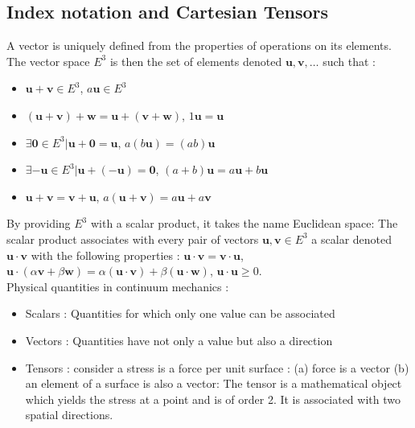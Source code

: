 \documentclass[../main.tex]{subfiles}
\begin{document}
\localtableofcontents

\subsection{Index notation and Cartesian Tensors}
A vector is uniquely defined from the properties of operations on its elements. The vector space $E^3$ is then the set of elements denoted $\mathbf{u}, \mathbf{v}, \dots$ such that : \begin{itemize}
    \item $\mathbf{u}+\mathbf{v} \in E^3$, $a\mathbf{u}\in E^3$\\
    \item $(\mathbf{u}+\mathbf{v}) + \mathbf{w} = \mathbf{u} + (\mathbf{v} + \mathbf{w})$, $1\mathbf{u} = \mathbf{u}$\\
    \item $\exists \mathbf{0} \in E^3 \lvert \mathbf{u}+ \mathbf{0} = \mathbf{u}$, $a(b\mathbf{u}) = (ab)\mathbf{u}$\\
    \item $\exists -\mathbf{u}\in E^3 \lvert \mathbf{u} + (-\mathbf{u})=\mathbf{0}$, $(a+b)\mathbf{u} = a\mathbf{u} + b\mathbf{u}$\\
    \item $\mathbf{u}+ \mathbf{v} = \mathbf{v} + \mathbf{u}$, $a(\mathbf{u}+\mathbf{v}) = a\mathbf{u} + a\mathbf{v}$\\
\end{itemize}
By providing $E^3$ with a scalar product, it takes the name Euclidean space: The scalar product associates with every pair of vectors $\mathbf{u}, \mathbf{v} \in E^3$ a scalar denoted $\mathbf{u}\cdot \mathbf{v}$ with the following properties : $\mathbf{u}\cdot \mathbf{v} = \mathbf{v} \cdot \mathbf{u}$, $\mathbf{u} \cdot (\alpha \mathbf{v}+ \beta \mathbf{w}) = \alpha (\mathbf{u}\cdot \mathbf{v})+\beta (\mathbf{u}\cdot \mathbf{w})$, $\mathbf{u}\cdot \mathbf{u}\geq 0$.\\

Physical quantities in continuum mechanics : \\
\begin{itemize}
    \item Scalars : Quantities for which only one value can be associated\\
    \item Vectors : Quantities have not only a value but also a direction\\
    \item Tensors : consider a stress is a force per unit surface : (a) force is a vector (b) an element of a surface is also a vector: The tensor is a mathematical object which yields the stress at a point and is of order 2. It is associated with two spatial directions.
    \\
\end{itemize}
\end{document}
